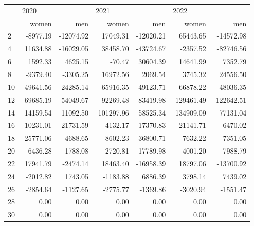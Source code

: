 \begin{tabular}{lrrrrrr}
\toprule
{} & \multicolumn{2}{l}{2020} & \multicolumn{2}{l}{2021} & \multicolumn{2}{l}{2022} \\
{} &     women &       men &      women &       men &      women &        men \\
\midrule
2  &  -8977.19 & -12074.92 &   17049.31 & -12020.21 &   65443.65 &  -14572.98 \\
4  &  11634.88 & -16029.05 &   38458.70 & -43724.67 &   -2357.52 &  -82746.56 \\
6  &   1592.33 &   4625.15 &     -70.47 &  30604.39 &   14641.99 &    7352.79 \\
8  &  -9379.40 &  -3305.25 &   16972.56 &   2069.54 &    3745.32 &   24556.50 \\
10 & -49641.56 & -24285.14 &  -65916.35 & -49123.71 &  -66878.22 &  -48036.35 \\
12 & -69685.19 & -54049.67 &  -92269.48 & -83419.98 & -129461.49 & -122642.51 \\
14 & -14159.54 & -11092.50 & -101297.96 & -58525.34 & -134909.09 &  -77131.04 \\
16 &  10231.01 &  21731.59 &   -4132.17 &  17370.83 &  -21141.71 &   -6470.02 \\
18 & -25771.06 &  -4688.65 &   -8602.23 &  36800.71 &   -7632.22 &    7351.05 \\
20 &  -6436.28 &  -1788.08 &    2720.81 &  17789.98 &   -4001.20 &    7988.79 \\
22 &  17941.79 &  -2474.14 &   18463.40 & -16958.39 &   18797.06 &  -13700.92 \\
24 &  -2012.82 &   1743.05 &   -1183.88 &   6886.39 &    3798.14 &    7439.02 \\
26 &  -2854.64 &  -1127.65 &   -2775.77 &  -1369.86 &   -3020.94 &   -1551.47 \\
28 &      0.00 &      0.00 &       0.00 &      0.00 &       0.00 &       0.00 \\
30 &      0.00 &      0.00 &       0.00 &      0.00 &       0.00 &       0.00 \\
\bottomrule
\end{tabular}
